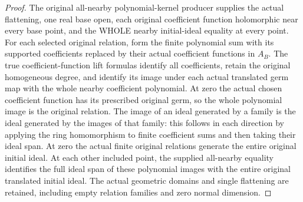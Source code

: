 \begin{proof}
The original all-nearby polynomial-kernel producer supplies the actual
flattening, one real base open, each original coefficient function holomorphic
near every base point, and the WHOLE nearby initial-ideal equality at every
point. For each selected original relation, form the finite polynomial sum
with its supported coefficients replaced by their actual coefficient functions
in $A_B$. The true coefficient-function lift formulas identify all coefficients,
retain the original homogeneous degree, and identify its image under each
actual translated germ map with the whole nearby coefficient polynomial.
At zero the actual chosen coefficient function has its prescribed original
germ, so the whole polynomial image is the original relation. The image of
an ideal generated by a family is the ideal generated by the images of that
family: this follows in each direction by applying the ring homomorphism to
finite coefficient sums and then taking their ideal span. At zero the actual
finite original relations generate the entire original initial ideal.
At each other included point, the supplied all-nearby equality identifies
the full ideal span of these polynomial images with the entire original
translated initial ideal. The actual geometric domains and single flattening
are retained, including empty relation families and zero normal dimension.
\end{proof}


